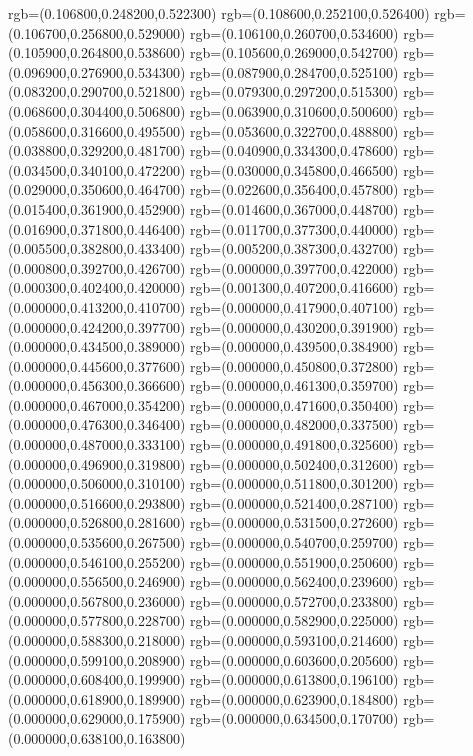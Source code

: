 {{		rgb=(0.106800,0.248200,0.522300)
		rgb=(0.108600,0.252100,0.526400)
		rgb=(0.106700,0.256800,0.529000)
		rgb=(0.106100,0.260700,0.534600)
		rgb=(0.105900,0.264800,0.538600)
		rgb=(0.105600,0.269000,0.542700)
		rgb=(0.096900,0.276900,0.534300)
		rgb=(0.087900,0.284700,0.525100)
		rgb=(0.083200,0.290700,0.521800)
		rgb=(0.079300,0.297200,0.515300)
		rgb=(0.068600,0.304400,0.506800)
		rgb=(0.063900,0.310600,0.500600)
		rgb=(0.058600,0.316600,0.495500)
		rgb=(0.053600,0.322700,0.488800)
		rgb=(0.038800,0.329200,0.481700)
		rgb=(0.040900,0.334300,0.478600)
		rgb=(0.034500,0.340100,0.472200)
		rgb=(0.030000,0.345800,0.466500)
		rgb=(0.029000,0.350600,0.464700)
		rgb=(0.022600,0.356400,0.457800)
		rgb=(0.015400,0.361900,0.452900)
		rgb=(0.014600,0.367000,0.448700)
		rgb=(0.016900,0.371800,0.446400)
		rgb=(0.011700,0.377300,0.440000)
		rgb=(0.005500,0.382800,0.433400)
		rgb=(0.005200,0.387300,0.432700)
		rgb=(0.000800,0.392700,0.426700)
		rgb=(0.000000,0.397700,0.422000)
		rgb=(0.000300,0.402400,0.420000)
		rgb=(0.001300,0.407200,0.416600)
		rgb=(0.000000,0.413200,0.410700)
		rgb=(0.000000,0.417900,0.407100)
		rgb=(0.000000,0.424200,0.397700)
		rgb=(0.000000,0.430200,0.391900)
		rgb=(0.000000,0.434500,0.389000)
		rgb=(0.000000,0.439500,0.384900)
		rgb=(0.000000,0.445600,0.377600)
		rgb=(0.000000,0.450800,0.372800)
		rgb=(0.000000,0.456300,0.366600)
		rgb=(0.000000,0.461300,0.359700)
		rgb=(0.000000,0.467000,0.354200)
		rgb=(0.000000,0.471600,0.350400)
		rgb=(0.000000,0.476300,0.346400)
		rgb=(0.000000,0.482000,0.337500)
		rgb=(0.000000,0.487000,0.333100)
		rgb=(0.000000,0.491800,0.325600)
		rgb=(0.000000,0.496900,0.319800)
		rgb=(0.000000,0.502400,0.312600)
		rgb=(0.000000,0.506000,0.310100)
		rgb=(0.000000,0.511800,0.301200)
		rgb=(0.000000,0.516600,0.293800)
		rgb=(0.000000,0.521400,0.287100)
		rgb=(0.000000,0.526800,0.281600)
		rgb=(0.000000,0.531500,0.272600)
		rgb=(0.000000,0.535600,0.267500)
		rgb=(0.000000,0.540700,0.259700)
		rgb=(0.000000,0.546100,0.255200)
		rgb=(0.000000,0.551900,0.250600)
		rgb=(0.000000,0.556500,0.246900)
		rgb=(0.000000,0.562400,0.239600)
		rgb=(0.000000,0.567800,0.236000)
		rgb=(0.000000,0.572700,0.233800)
		rgb=(0.000000,0.577800,0.228700)
		rgb=(0.000000,0.582900,0.225000)
		rgb=(0.000000,0.588300,0.218000)
		rgb=(0.000000,0.593100,0.214600)
		rgb=(0.000000,0.599100,0.208900)
		rgb=(0.000000,0.603600,0.205600)
		rgb=(0.000000,0.608400,0.199900)
		rgb=(0.000000,0.613800,0.196100)
		rgb=(0.000000,0.618900,0.189900)
		rgb=(0.000000,0.623900,0.184800)
		rgb=(0.000000,0.629000,0.175900)
		rgb=(0.000000,0.634500,0.170700)
		rgb=(0.000000,0.638100,0.163800)
}}
